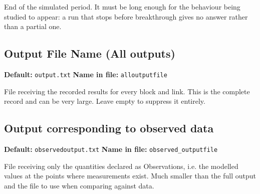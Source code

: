 \documentclass[11pt]{article}
\begin{document}
End of the simulated period. It must be long enough for the behaviour being studied to appear: a run that stops before breakthrough gives no answer rather than a partial one.
\subsection{Output File Name (All outputs)}
{\small \textbf{Default:} \texttt{output.\allowbreak{}txt} \quad\textbullet\quad \textbf{Name in file:} \texttt{alloutputfile}}

File receiving the recorded results for every block and link. This is the complete record and can be very large. Leave empty to suppress it entirely.
\subsection{Output corresponding to observed data}
{\small \textbf{Default:} \texttt{observedoutput.\allowbreak{}txt} \quad\textbullet\quad \textbf{Name in file:} \texttt{observed\_\allowbreak{}outputfile}}

File receiving only the quantities declared as Observations, i.e. the modelled values at the points where measurements exist. Much smaller than the full output and the file to use when comparing against data.
\end{document}
